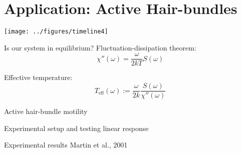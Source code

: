 \documentclass[xcolor=x11names,compress]{beamer}
\renewcommand{\(}{\begin{columns}}
\renewcommand{\)}{\end{columns}}
\newcommand{\<}[1]{\begin{column}{#1}}
\renewcommand{\>}{\end{column}}
\begin{document}
\section{Application: Active Hair-bundles}
\label{sec:application_active_hearing}
\begin{frame}[t]{}
    \texttt{[image: ../figures/timeline4]}
\end{frame}


\begin{frame}[t]{Is our system in equilibrium?}
Fluctuation-dissipation theorem:
\begin{equation*}
\chi''(\omega) 
    = \frac{\omega}{2 kT} S(\omega) 
\end{equation*}

Effective temperature:
\begin{equation*}
T_{\text{eff}}(\omega) := \frac{\omega}{2k}\frac{S(\omega)}{\chi''(\omega)}
\end{equation*}
\end{frame}


\begin{frame}[t]{Active hair-bundle motility}
\end{frame}


\begin{frame}[t]{Experimental setup and testing linear response}
\end{frame}

\begin{frame}[t]{Experimental results}
    Martin et al., 2001
\end{frame}
\end{document}

